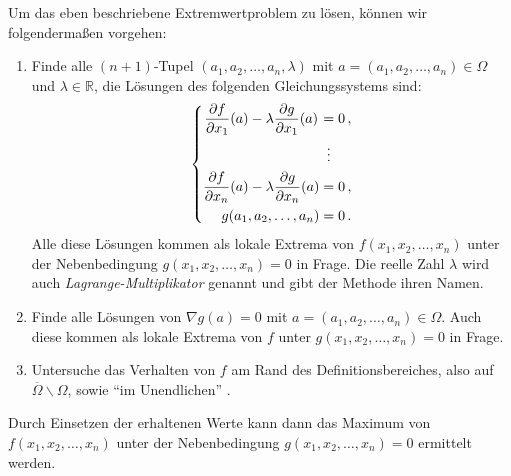 \begin{satzmitnamen}
	Um das eben beschriebene Extremwertproblem zu lösen, können wir folgendermaßen vorgehen:
	\begin{enumerate}
		\item Finde alle $(n+1)$-Tupel $(a_1,a_2,\dotsc,a_n,\lambda)$ mit $a=(a_1,a_2,\dotsc,a_n)\in\Omega$ und $\lambda\in \mathbb R$, die Lösungen des folgenden Gleichungssystems sind:\label{schritt:Gleichungssystem}
		\begin{equation*}
			\left\{\begin{alignedat}{2}
				\frac{\partial f}{\partial x_1}(a)&-\lambda\frac{\partial g}{\partial x_1}(a)&&=0\,,\\
				&&&\mathrel{\tikz[inner sep=0,outer sep=0]{\node at (0,-0.5ex) {$\phantom{=}$};\node at (0,0) {$\vdots$};}}\\
				\frac{\partial f}{\partial x_n}(a)&-\lambda\frac{\partial g}{\partial x_n}(a)&&=0\,,\\
				&&\llap{$g(a_1,a_2,\dotsc,a_n)$}&=0\,.
			\end{alignedat}\right.
		\end{equation*}
		Alle diese Lösungen kommen als lokale Extrema von $f(x_1,x_2,\dotsc,x_n)$ unter der Nebenbedingung $g(x_1,x_2,\dotsc,x_n)=0$ in Frage. Die reelle Zahl $\lambda$ wird auch \emph{Lagrange-Multiplikator} genannt und gibt der Methode ihren Namen.
		\item Finde alle Lösungen von $\nabla g(a)=0$ mit $a=(a_1,a_2,\dotsc,a_n)\in\Omega$. Auch diese kommen als lokale Extrema von $f$ unter $g(x_1,x_2,\dotsc,x_n)=0$ in Frage.\label{schritt:SingulaerePunkte}
		\item Untersuche das Verhalten von $f$ am Rand des Definitionsbereiches, also auf $\overline{\Omega}\smallsetminus\Omega$, sowie \enquote{im Unendlichen} .\label{schritt:VerhaltenAmRand}
	\end{enumerate}
	Durch Einsetzen der erhaltenen Werte kann dann das Maximum von $f(x_1,x_2,\dotsc,x_n)$ unter der Nebenbedingung $g(x_1,x_2,\dotsc,x_n)=0$ ermittelt werden.
\end{satzmitnamen}
